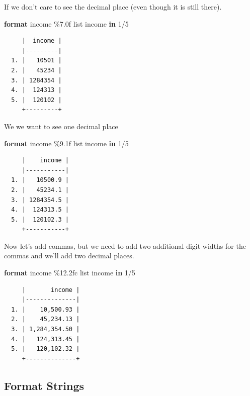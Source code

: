 \documentclass[
]{book}
\newenvironment{Shaded}{\begin{snugshade}}{\end{snugshade}}
\newcommand{\KeywordTok}[1]{\textcolor[rgb]{0.13,0.29,0.53}{\textbf{#1}}}
\newcommand{\NormalTok}[1]{#1}
\newcommand{\OtherTok}[1]{\textcolor[rgb]{0.56,0.35,0.01}{#1}}
\begin{document}
If we don't care to see the decimal place (even though it is still there).

\begin{Shaded}
\begin{Highlighting}[]
\KeywordTok{format}\NormalTok{ income \%7.0f}
\OtherTok{list}\NormalTok{ income }\KeywordTok{in}\NormalTok{ 1/5}
\end{Highlighting}
\end{Shaded}

\begin{verbatim}
     |  income |
     |---------|
  1. |   10501 |
  2. |   45234 |
  3. | 1284354 |
  4. |  124313 |
  5. |  120102 |
     +---------+
\end{verbatim}

We we want to see one decimal place

\begin{Shaded}
\begin{Highlighting}[]
\KeywordTok{format}\NormalTok{ income \%9.1f}
\OtherTok{list}\NormalTok{ income }\KeywordTok{in}\NormalTok{ 1/5}
\end{Highlighting}
\end{Shaded}

\begin{verbatim}
     |    income |
     |-----------|
  1. |   10500.9 |
  2. |   45234.1 |
  3. | 1284354.5 |
  4. |  124313.5 |
  5. |  120102.3 |
     +-----------+
\end{verbatim}

Now let's add commas, but we need to add two additional digit widths for the commas and we'll add two decimal places.

\begin{Shaded}
\begin{Highlighting}[]
\KeywordTok{format}\NormalTok{ income \%12.2fc}
\OtherTok{list}\NormalTok{ income }\KeywordTok{in}\NormalTok{ 1/5}
\end{Highlighting}
\end{Shaded}

\begin{verbatim}
     |       income |
     |--------------|
  1. |    10,500.93 |
  2. |    45,234.13 |
  3. | 1,284,354.50 |
  4. |   124,313.45 |
  5. |   120,102.32 |
     +--------------+
\end{verbatim}

\subsection{Format Strings}\label{format-strings}
\end{document}
